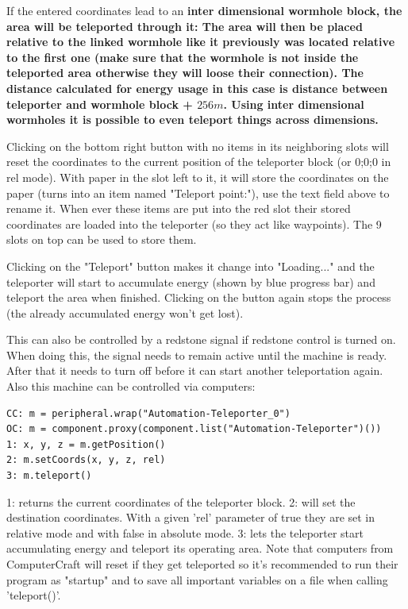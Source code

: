\documentclass[11pt]{article} %
\begin{document}
If the entered coordinates lead to an \bf inter dimensional wormhole \rm block, the area will be teleported through it: The area will then be placed relative to the linked wormhole like it previously was located relative to the first one (make sure that the wormhole is not inside the teleported area otherwise they will loose their connection). The distance calculated for energy usage in this case is distance between teleporter and wormhole block + $256m$. Using inter dimensional wormholes it is possible to even teleport things across dimensions.

Clicking on the bottom right button with no items in its neighboring slots will reset the coordinates to the current position of the teleporter block (or 0;0;0 in rel mode). With paper in the slot left to it, it will store the coordinates on the paper (turns into an item named "Teleport point:"), use the text field above to rename it. When ever these items are put into the red slot their stored coordinates are loaded into the teleporter (so they act like waypoints). The 9 slots on top can be used to store them.

Clicking on the "Teleport" button makes it change into "Loading..." and the teleporter will start to accumulate energy (shown by blue progress bar) and teleport the area when finished. Clicking on the button again stops the process (the already accumulated energy won't get lost). 

This can also be controlled by a redstone signal if redstone control is turned on. When doing this, the signal needs to remain active until the machine is ready. After that it needs to turn off before it can start another teleportation again.\\

Also this machine can be controlled via computers:
\begin{lstlisting}
CC: m = peripheral.wrap("Automation-Teleporter_0")
OC: m = component.proxy(component.list("Automation-Teleporter")())
1: x, y, z = m.getPosition()
2: m.setCoords(x, y, z, rel)
3: m.teleport()
\end{lstlisting}
1: returns the current coordinates of the teleporter block. 2: will set the destination coordinates. With a given 'rel' parameter of true they are set in relative mode and with false in absolute mode. 3: lets the teleporter start accumulating energy and teleport its operating area. Note that computers from ComputerCraft will reset if they get teleported so it's recommended to run their program as "startup" and to save all important variables on a file when calling 'teleport()'. 
\end{document}
